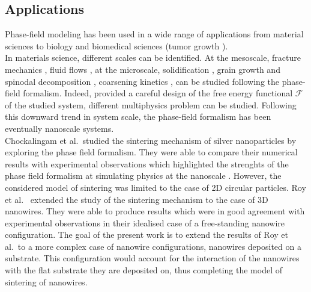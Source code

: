 \subsection{Applications}
    Phase-field modeling has been used in a wide range of applications from material sciences to biology and biomedical sciences (tumor growth \cite{XiaoFengShi2023}).\\
    In materials science, different scales can be identified. At the mesoscale, fracture mechanics \cite{XueChengLeiWen2022}, fluid flows \cite{Kim2009}, at the microscale, solidification \cite{KimKim2005}, grain growth and spinodal decomposition \cite{CartaladeYounsiRégnierSchuller2014}, coarsening kinetics \cite{ZhuChenShenTikare1999,KönigRonsinHarting2021}, can be studied following the phase-field formalism. Indeed, provided a careful design of the free energy functional $\mathcal{F}$ of the studied system, different multiphysics problem can be studied. Following this downward trend in system scale, the phase-field formalism has been eventually nanoscale systems.\\
    Chockalingam et al.~studied the sintering mechanism of silver nanoparticles by exploring the phase field formalism. They were able to compare their numerical results with experimental observations which highlighted the strenghts of the phase field formalism at simulating physics at the nanoscale \cite{ChockalingamKouznetsovaSluisGeers2016}. However, the considered model of sintering was limited to the case of 2D circular particles. Roy et al.~\cite{RoyVarmaGururajan2021} extended the study of the sintering mechanism to the case of 3D nanowires. They were able to produce results which were in good agreement with experimental observations in their idealised case of a free-standing nanowire configuration. The goal of the present work is to extend the results of Roy et al.~to a more complex case of nanowire configurations, nanowires deposited on a substrate. This configuration would account for the interaction of the nanowires with the flat substrate they are deposited on, thus completing the model of sintering of nanowires.